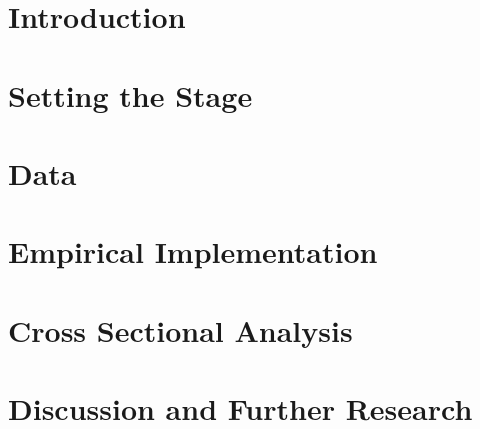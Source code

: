 \documentclass[english, 11pt]{article}
\begin{document}

\clearpage

\thispagestyle{empty}


\clearpage

\setcounter{tocdepth}{2}
{ \tableofcontents }
\thispagestyle{empty}

\clearpage
\setcounter{page}{1}
\section{Introduction} \label{section:Introduction}

\clearpage

\section{Setting the Stage}
\label{section:Setting}

\clearpage

\section{Data}
\label{section:data}

\clearpage

\section{Empirical Implementation}
\label{section:empirical}

\clearpage

\section{Cross Sectional Analysis}
\label{section:cross}

\clearpage

%

\section{Discussion and Further Research}
\label{section:disco}

\clearpage
\end{document}
